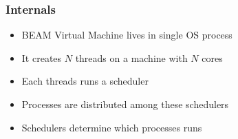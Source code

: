 \begin{frame}
    \frametitle{Internals}
    \begin{itemize}
        \item BEAM Virtual Machine lives in single OS process
        \item It creates $N$ threads on a machine with $N$ cores
        \item Each threads runs a scheduler
        \item Processes are distributed among these schedulers
        \item Schedulers determine which processes runs
    \end{itemize}
\end{frame}
